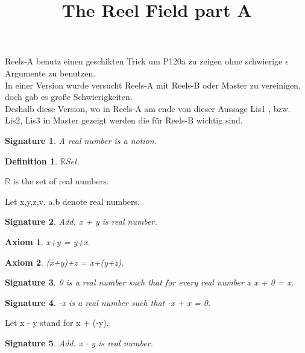 \documentclass{article}
\newenvironment{forthel}{\begin{leftbar}}{\end{leftbar}}
\newtheorem{axiom}{Axiom}
\newtheorem{definition}{Definition}
\newtheorem{signature}{Signature}
\begin{document}
\title{The Reel Field part A}

\maketitle

Reels-A benutz einen geschikten Trick um P120a zu zeigen ohne schwierige $\epsilon$ Argumente zu benutzen.\\
In einer Version wurde versucht Reels-A mit Reels-B oder Master zu vereinigen, doch gab es große Schwierigkeiten.\\
Deshalb diese Version, wo in Reels-A am ende von dieser Aussage Lis1 , bzw. Lis2, Lis3 in Master gezeigt werden die für Reels-B wichtig sind.\\ 

\begin{forthel}
[set/-s] [element/-s] [number/-s]

\begin{signature} A real number is a notion.

\end{signature}

\begin{definition} $\mathbb{R}$Set.

\end{definition}
$\mathbb{R}$ is the set of real numbers.

Let x,y,z,v, a,b denote real numbers.



\begin{signature} Add. x + y is real number.

\end{signature}
\begin{axiom} x+y = y+x.

\end{axiom}
\begin{axiom} (x+y)+z = x+(y+z).

\end{axiom}
\begin{signature} 0 is a real number such that for every real number x x + 0 = x.

\end{signature}
\begin{signature} -x is a real number such that -x + x = 0.

\end{signature}

Let x - y stand for x + (-y).

\begin{signature} Add. x $\cdot$ y is real number.


\end{signature}
\end{forthel}
\end{document}
